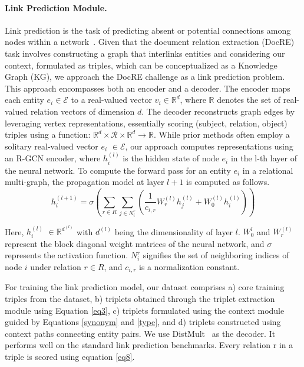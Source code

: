 \documentclass[letterpaper]{article} %
\begin{document}
\paragraph{\textbf{Link Prediction Module.}} Link prediction is the task of predicting absent or potential connections among nodes within a network~\cite{10.1145/956863.956972}. Given that the document relation extraction (DocRE) task involves constructing a graph that interlinks entities and considering our context, formulated as triples, which can be conceptualized as a Knowledge Graph (KG), we approach the DocRE challenge as a link prediction problem. This approach encompasses both an encoder and a decoder. The encoder maps each entity
\( e_{i} \in \mathcal{E} \) to a real-valued vector $v_i \in  \mathbb{R}^{d}$, where $\mathbb{R}$ denotes the set of real-valued relation vectors of dimension $d$.
The decoder reconstructs graph edges by leveraging vertex representations, essentially scoring (subject, relation, object) triples using a function:
\( \mathbb{R}^{d} \times \mathcal{R} \times \mathbb{R}^{d} \rightarrow \mathbb{R} \).
While prior methods often employ a solitary real-valued vector $e_i$ $\in \mathcal{E}$, our approach computes representations using an R-GCN \cite{DBLP:conf/esws/SchlichtkrullKB18} encoder, where $h_i^{(l)}$ is the hidden state of node $e_i$ in the l-th layer of the neural network. To compute the forward pass for an entity $e_i$ in a relational multi-graph, the propagation model at layer $l+1$ is computed as follows.
\begin{equation}
h_i^{(l+1)}=\sigma \left(\sum_{r\in{R}}\sum_{j\in{N_i^{r}}}(\frac{1}{c_{i,r}}W_r^{(l)}h_j^{(l)}+W_0^{(l)}h_{i}^{(l)}) \right)
\end{equation}

Here, $h_{i}^{(l)}$ $\in \mathbb{R}^{d^{(l)}}$ with $d^{(l)}$ being the dimensionality of layer $l$. $W_0^{l}$ and $W_r^{(l)}$ represent the block diagonal weight matrices of the neural network, and $\sigma$ represents the activation function. $N_i^{r}$ signifies the set of neighboring indices of node $i$ under relation $r \in R$, and $c_{i,r}$ is a normalization constant.

For training the link prediction model, our dataset comprises a) core training triples from the dataset, b) triplets obtained through the triplet extraction module using Equation \ref{eq3}, c) triplets formulated using the context module guided by Equations \ref{synonym} and \ref{type}, and d) triplets constructed using context paths connecting entity pairs.
We use DistMult~\cite{DBLP:journals/corr/YangYHGD14a} as the decoder. It performs well on the standard link prediction benchmarks. Every relation r in a triple is scored using equation \ref{eq8}.
\end{document}
